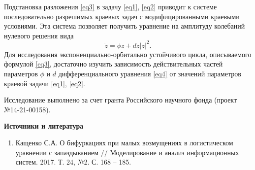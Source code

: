 \documentclass[a4paper, 12pt, oneside]{ncc}
\begin{document}
Подстановка разложения \eqref{eq3} в задачу \eqref{eq1}, \eqref{eq2} приводит к системе последовательно разрешимых краевых задач с модифицированными краевыми условиями. Эта система позволяет получить уравнение на амплитуду колебаний нулевого решения вида
\begin{equation}\label{eq4}
	\dot{z} = \phi z + dz|z|^2.
\end{equation}
Для исследования экспоненциально-орбитально устойчивого цикла, описываемого формулой \eqref{eq3}, достаточно изучить зависимость действительных частей параметров $ \phi $ и $ d $ дифференциального уравнения \eqref{eq4} от значений параметров краевой задачи \eqref{eq1}, \eqref{eq2}.

Исследование выполнено за счет гранта Российского научного фонда (проект №14-21-00158).

\begin{center}\textbf{Источники и литература}\end{center}
\begin{enumerate}
\item Кащенко С.А. О бифуркациях при малых возмущениях в логистическом уравнении с запаздыванием // Моделирование и анализ информационных систем. 2017. Т. 24, №2. С. 168 – 185.{\sloppy

}
\end{enumerate}
\\
\end{document}
